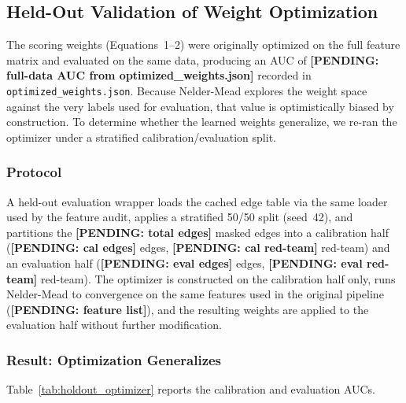 %

\subsection{Held-Out Validation of Weight Optimization}
\label{sec:holdout_weight}

The scoring weights (Equations~1--2) were originally optimized on the full feature matrix and evaluated on the same data, producing an AUC of \textbf{[PENDING: full-data AUC from optimized\_weights.json]} recorded in \texttt{optimized\_weights.json}. Because Nelder-Mead explores the weight space against the very labels used for evaluation, that value is optimistically biased by construction. To determine whether the learned weights generalize, we re-ran the optimizer under a stratified calibration/evaluation split.

\subsubsection{Protocol}

A held-out evaluation wrapper loads the cached edge table via the same loader used by the feature audit, applies a stratified 50/50 split (seed~42), and partitions the \textbf{[PENDING: total edges]} masked edges into a calibration half (\textbf{[PENDING: cal edges]} edges, \textbf{[PENDING: cal red-team]} red-team) and an evaluation half (\textbf{[PENDING: eval edges]} edges, \textbf{[PENDING: eval red-team]} red-team). The optimizer is constructed on the calibration half only, runs Nelder-Mead to convergence on the same features used in the original pipeline (\textbf{[PENDING: feature list]}), and the resulting weights are applied to the evaluation half without further modification.

\subsubsection{Result: Optimization Generalizes}

Table~\ref{tab:holdout_optimizer} reports the calibration and evaluation AUCs.

